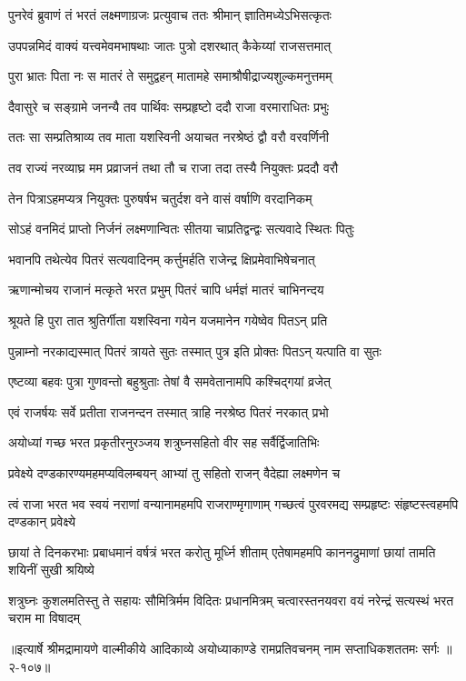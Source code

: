 
\twolineshloka
{पुनरेवं ब्रुवाणं तं भरतं लक्ष्मणाग्रजः}
{प्रत्युवाच ततः श्रीमान् ज्ञातिमध्येऽभिसत्कृतः} %

\twolineshloka
{उपपन्नमिदं वाक्यं यत्त्वमेवमभाषथाः}
{जातः पुत्रो दशरथात् कैकेय्यां राजसत्तमात्} %

\twolineshloka
{पुरा भ्रातः पिता नः स मातरं ते समुद्वहन्}
{मातामहे समाश्रौषीद्राज्यशुल्कमनुत्तमम्} %

\twolineshloka
{दैवासुरे च सङ्ग्रामे जनन्यै तव पार्थिवः}
{सम्प्रहृष्टो ददौ राजा वरमाराधितः प्रभुः} %

\twolineshloka
{ततः सा सम्प्रतिश्राव्य तव माता यशस्विनी}
{अयाचत नरश्रेष्ठं द्वौ वरौ वरवर्णिनी} %

\twolineshloka
{तव राज्यं नरव्याघ्र मम प्रव्राजनं तथा}
{तौ च राजा तदा तस्यै नियुक्तः प्रददौ वरौ} %

\twolineshloka
{तेन पित्राऽहमप्यत्र नियुक्तः पुरुषर्षभ}
{चतुर्दश वने वासं वर्षाणि वरदानिकम्} %

\twolineshloka
{सोऽहं वनमिदं प्राप्तो निर्जनं लक्ष्मणान्वितः}
{सीतया चाप्रतिद्वन्द्वः सत्यवादे स्थितः पितुः} %

\twolineshloka
{भवानपि तथेत्येव पितरं सत्यवादिनम्}
{कर्त्तुमर्हति राजेन्द्र क्षिप्रमेवाभिषेचनात्} %

\twolineshloka
{ऋणान्मोचय राजानं मत्कृते भरत प्रभुम्}
{पितरं चापि धर्मज्ञं मातरं चाभिनन्दय} %

\twolineshloka
{श्रूयते हि पुरा तात श्रुतिर्गीता यशस्विना}
{गयेन यजमानेन गयेष्वेव पितऽन् प्रति} %

\twolineshloka
{पुन्नाम्नो नरकाद्यस्मात् पितरं त्रायते सुतः}
{तस्मात् पुत्र इति प्रोक्तः पितऽन् यत्पाति वा सुतः} %

\twolineshloka
{एष्टव्या बहवः पुत्रा गुणवन्तो बहुश्रुताः}
{तेषां वै समवेतानामपि कश्चिद्गयां व्रजेत्} %

\twolineshloka
{एवं राजर्षयः सर्वे प्रतीता राजनन्दन}
{तस्मात् त्राहि नरश्रेष्ठ पितरं नरकात् प्रभो} %

\twolineshloka
{अयोध्यां गच्छ भरत प्रकृतीरनुरञ्जय}
{शत्रुघ्नसहितो वीर सह सर्वैर्द्विजातिभिः} %

\twolineshloka
{प्रवेक्ष्ये दण्डकारण्यमहमप्यविलम्बयन्}
{आभ्यां तु सहितो राजन् वैदेह्या लक्ष्मणेन च} %

\twolineshloka
{त्वं राजा भरत भव स्वयं नराणां वन्यानामहमपि राजराण्मृगाणाम्}
{गच्छत्वं पुरवरमद्य सम्प्रहृष्टः संहृष्टस्त्वहमपि दण्डकान् प्रवेक्ष्ये} %

\twolineshloka
{छायां ते दिनकरभाः प्रबाधमानं वर्षत्रं भरत करोतु मूर्ध्नि शीताम्}
{एतेषामहमपि काननद्रुमाणां छायां तामति शयिनीं सुखी श्रयिष्ये} %

\twolineshloka
{शत्रुघ्नः कुशलमतिस्तु ते सहायः सौमित्रिर्मम विदितः प्रधानमित्रम्}
{चत्वारस्तनयवरा वयं नरेन्द्रं सत्यस्थं भरत चराम मा विषादम्} %


॥इत्यार्षे श्रीमद्रामायणे वाल्मीकीये आदिकाव्ये अयोध्याकाण्डे रामप्रतिवचनम् नाम सप्ताधिकशततमः सर्गः ॥२-१०७॥
